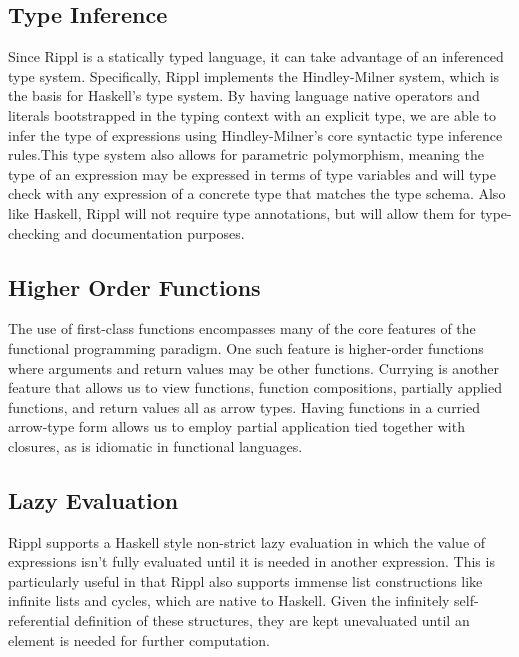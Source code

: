 ﻿\documentclass[5pt]{article}
\begin{document}
\subsection{Type Inference}
Since Rippl is a statically typed language, it can take advantage of an inferenced type system. Specifically, Rippl implements the Hindley-Milner system, which is the basis for Haskell’s type system. By having language native operators and literals bootstrapped in the typing context with an explicit type, we are able to infer the type of expressions using Hindley-Milner's core syntactic type inference rules.This type system also allows for parametric polymorphism, meaning the type of an expression may be expressed in terms of type variables and will type check with any expression of a concrete type that matches the type schema. Also like Haskell, Rippl will not require type annotations, but will allow them for type-checking and documentation purposes.
\subsection{Higher Order Functions}
The use of first-class functions encompasses many of the core features of the functional programming paradigm. One such feature is higher-order functions where arguments and return values may be other functions. Currying is another feature that allows us to view functions, function compositions, partially applied functions, and return values all as arrow types. Having functions in a curried arrow-type form allows us to employ partial application tied together with closures, as is idiomatic in functional languages.
\subsection{Lazy Evaluation}
Rippl supports a Haskell style non-strict lazy evaluation in which the value of expressions isn’t fully evaluated until it is needed in another expression. This is particularly useful in that Rippl also supports immense list constructions like infinite lists and cycles, which are native to Haskell. Given the infinitely self-referential definition of these structures, they are kept unevaluated until an element is needed for further computation.
\pagebreak
\end{document}

